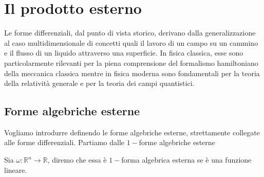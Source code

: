 \chapter{Il prodotto esterno}
\pagestyle{plain}
\thispagestyle{empty}
\pagestyle{fancy}
Le forme differenziali, dal punto di vista storico, derivano dalla generalizzazione al caso multidimensionale di concetti
quali il lavoro di un campo su un cammino e il flusso di un liquido attraverso una superficie. In fisica classica, esse sono particolarmente
rilevanti per la piena comprensione del formalismo hamiltoniano della meccanica classica mentre in fisica moderna sono fondamentali per la
teoria della relatività generale e per la teoria dei campi quantistici.

\section{Forme algebriche esterne}
Vogliamo introdurre definendo le forme algebriche esterne, strettamente collegate alle forme differenziali. Partiamo dalle $1-$forme algebriche esterne
\begin{definition}
    Sia $\omega : \mathbb{R}^n \to \mathbb{R}$, diremo che essa è $1-$forma algebrica esterna se è una funzione lineare.
\end{definition}